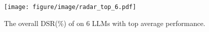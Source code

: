 \begin{figure}[!ht]
    \centering
    \texttt{[image: figure/image/radar\_top\_6.pdf]}
    \caption{The overall DSR(\%) of \ourbench on 6 LLMs with top average performance.}
    \label{fig:overall_bycat_radar}
\end{figure}